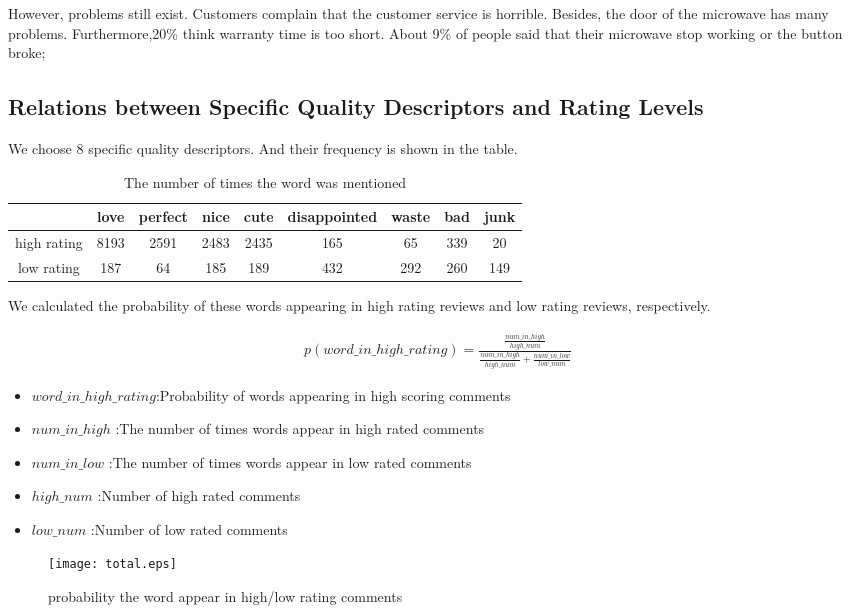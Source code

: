 \documentclass{mcmthesis}
\begin{document}
		However, problems still exist. Customers complain that the customer service is horrible. Besides, the door of the microwave has many problems. Furthermore,20\% think warranty time is too short. About 9\% of people said that their microwave stop working or the button broke;

	
	
	\subsection{Relations between Specific Quality Descriptors and Rating Levels}
	We choose 8 specific quality descriptors. And their frequency is shown in the table.
	\begin{table}[H]
		\centering
		\caption{The number of times the word was mentioned}
		\begin{tabular}{|c|c|c|c|c|c|c|c|c|}
			\hline 
			& love & perfect & nice & cute & disappointed & waste & bad & junk \\ 
			\hline 
			high rating & 8193 & 2591 & 2483 & 2435 & 165 & 65 & 339 & 20 \\ 
			\hline 
			low rating & 187 & 64 & 185 & 189 & 432 & 292 & 260 & 149 \\ 
			\hline 
		\end{tabular}
	\end{table}
	
	We calculated the probability of these words appearing in high rating reviews and low rating reviews, respectively.
	
	\begin{align}
	p(word\_in\_high\_rating)=\frac{\frac{num\_in\_high}{high\_num}}
	{\frac{num\_in\_high}{high\_num}+\frac{num\_in\_low}{low\_num}}
	\end{align}

		\begin{itemize}
			\item  $word\_in\_high\_rating$:Probability of words appearing in high scoring comments 
			\item	$num\_in\_high$ :The number of times words appear in high rated comments
			\item $num\_in\_low$ :The number of times words appear in low rated comments
			\item $high\_num$ :Number of high rated comments
			\item $low\_num$ :Number of low rated comments
		\end{itemize}

	
	\begin{figure}[H]
		\begin{minipage}[t]{1\textwidth}
			\centering
			\texttt{[image: total.eps]}
			\caption{probability the word appear in high/low rating comments\label{fig:1}}
		\end{minipage}
	\end{figure}
\end{document}
